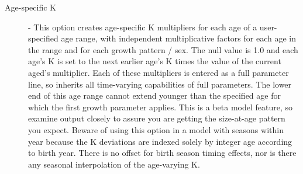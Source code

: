 \begin{description}
	\item[Age-specific K] - This option creates age-specific K multipliers for each age of a user-specified age range, with independent multiplicative factors for each age in the range and for each growth pattern / sex.  The null value is 1.0 and each age's K is set to the next earlier age's K times the value of the current aged's multiplier.  Each of these multipliers is entered as a full parameter line, so inherits all time-varying capabilities of full parameters.  The lower end of this age range cannot extend younger than the specified age for which the first growth parameter applies.  This is a beta model feature, so examine output closely to assure you are getting the size-at-age pattern you expect.  Beware of using this option in a model with seasons within year because the K deviations are indexed solely by integer age according to birth year.  There is no offset for birth season timing effects, nor is there any seasonal interpolation of the age-varying K.
\end{description}

